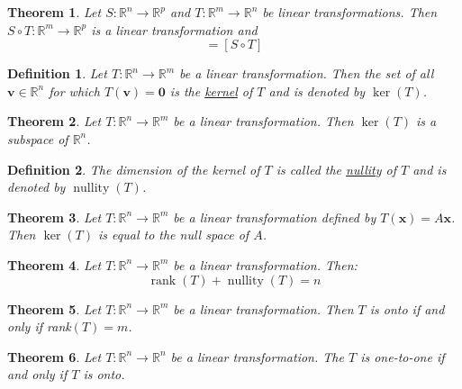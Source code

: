 \documentclass{article}
\theoremstyle{definitionstyle}
\newtheorem{definition}{Definition}[section]
\newtheorem{theorem}{Theorem}[section]
\begin{document}
\begin{theorem}
    Let $S:\mathbb{R}^n \to \mathbb{R}^p$ and $T:\mathbb{R}^m \to \mathbb{R}^n$ be linear transformations.
    Then $S \circ T: \mathbb{R}^m \to \mathbb{R}^p$ is a linear transformation and
    \begin{equation*}
        [S][T]=[S \circ T]
    \end{equation*}
\end{theorem}

\begin{definition}
    Let $T:\mathbb{R}^n \to \mathbb{R}^m$ be a linear transformation. Then the set of all $\mathbf{v} \in \mathbb{R}^n$
    for which $T(\mathbf{v})=\mathbf{0}$ is the \underline{kernel} of $T$ and is denoted by $\ker(T)$.
\end{definition}

\begin{theorem}
    Let $T:\mathbb{R}^n \to \mathbb{R}^m$ be a linear transformation. Then $\ker(T)$ is a
    subspace of $\mathbb{R}^n$.
\end{theorem}

\begin{definition}
    The dimension of the kernel of $T$ is called the \underline{nullity} of $T$ and is denoted
    by $\operatorname*{nullity}(T)$.
\end{definition}

\begin{theorem}
    Let $T:\mathbb{R}^n \to \mathbb{R}^m$ be a linear transformation defined by $T(\mathbf{x})=A\mathbf{x}$. Then
    $\ker(T)$ is equal to the null space of $A$.
\end{theorem}

\begin{theorem}
    Let $T:\mathbb{R}^n \to \mathbb{R}^m$ be a linear transformation. Then:
    \begin{equation*}
        \operatorname*{rank}(T)+\operatorname*{nullity}(T)=n
    \end{equation*}
\end{theorem}

\begin{theorem}
    Let $T:\mathbb{R}^n \to \mathbb{R}^m$ be a linear transformation. Then $T$ is onto if and only if rank$(T)=m$.
\end{theorem}

\begin{theorem}
    Let $T:\mathbb{R}^n \to \mathbb{R}^n$ be a linear transformation. The $T$ is one-to-one if and only if $T$ is onto.
\end{theorem}
\end{document}
